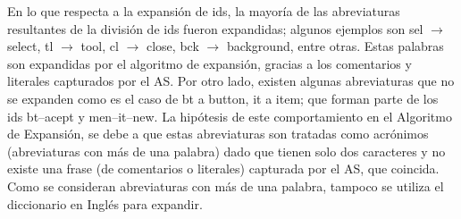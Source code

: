 En lo que respecta a la expansión de ids, la mayoría de las abreviaturas resultantes de la división de ids fueron expandidas; algunos ejemplos son \textsf{sel} $\rightarrow$ \textsf{select}, \textsf{tl} $\rightarrow$ \textsf{tool}, \textsf{cl} $\rightarrow$ \textsf{close}, \textsf{bck} $\rightarrow$ \textsf{background}, entre otras. Estas palabras son expandidas por el algoritmo de expansión, gracias a los comentarios y literales capturados por el AS.
Por otro lado, existen algunas abreviaturas que no se expanden como es el caso de \textsf{bt} a \textsf{button}, \textsf{it} a \textsf{item}; que forman parte de los ids \textsf{bt--acept} y \textsf{men--it--new}. La hipótesis de este comportamiento en el Algoritmo de Expansión, se debe a que estas abreviaturas son tratadas como acrónimos (abreviaturas con más de una palabra) dado que tienen solo dos caracteres y no existe una frase (de comentarios o literales) capturada por el AS, que coincida. Como se consideran abreviaturas con más de una palabra, tampoco se utiliza el diccionario en Inglés para expandir.


